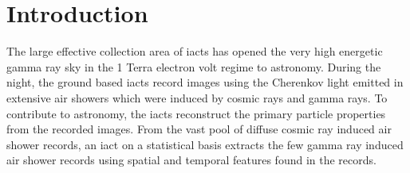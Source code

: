 \documentclass[review]{elsarticle}
\begin{document}
\newcommand{\RadioCoeffCresponse}{r_\text{resp}}
\newcommand{\RadioCoeffTexp}{r_\text{expo}}
\newcommand{\RadioConstant}{r_\text{const}}
\newcommand{\NormalizedMirrorResponse}{R}
\newcommand{\StarIntensity}{s}
\newcommand{\MirrorReflectionIntensity}{m}
\newcommand{\RelativePointing}{\Theta}
\newcommand{\texp}{T_\text{expo}}
\newcommand{\iflux}{I_\text{pix}}
\newcommand{\cresponse}{C_\text{pix}}
\newcommand{\geom}{\alpha}
\newcommand{\FigCapLabSca}[4]{
    \begin{figure}[H]
        \begin{center}
            \texttt{[image: \#1]}
            \caption[]{#2}
            \label{#3}
        \end{center}
    \end{figure}
}
\newcommand{\FigCapLab}[3]{
    \FigCapLabSca{#1}{#2}{#3}{1.0}
}
\newcommand{\TwoFigsSideBySide}[2]{
    \begin{minipage}[t]{0.485\linewidth}
        \vspace{-0.5cm}
        \texttt{[image: \#1]}
    \end{minipage}
    \hfill
    \begin{minipage}[t]{0.485\linewidth}
        \vspace{-0.5cm}
        \texttt{[image: \#2]}
        \vspace{-1cm}
    \end{minipage}
}
\newcommand{\SideBySide}[2]{
    \newline
    \begin{minipage}[t]{0.485\linewidth}
        #1
        \end{minipage}
    \hfill
        \begin{minipage}[t]{0.485\linewidth}
        #2
    \end{minipage}\\
}
\section{Introduction}
%
The large effective collection area of \acfp{iact} has opened the very high energetic gamma ray sky in the 1 Terra electron volt regime to astronomy.
%
During the night, the ground based \acsp{iact} record images using the Cherenkov light emitted in extensive air showers which were induced by cosmic rays and gamma rays.
%
To contribute to astronomy, the \acsp{iact} reconstruct the primary particle properties from the recorded images.
%
From the vast pool of diffuse cosmic ray induced air shower records, an \acs{iact} on a statistical basis extracts the few gamma ray induced air shower records using spatial and temporal features found in the records.
%
\end{document}
